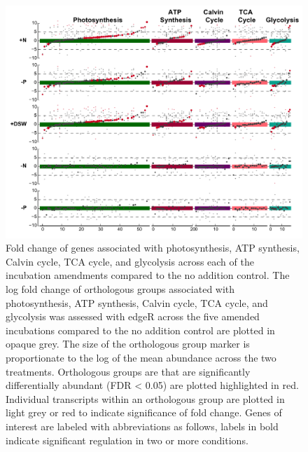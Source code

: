 \begin{figure}[p!]

  \centering
  \includegraphics[width=1\textwidth]{Images/C6_FigureS7_MckewATP.pdf}
    \caption[Fold change of genes associated with photosynthesis, ATP synthesis, Calvin cycle, TCA cycle, and glycolysis across each of the incubation amendments]{Fold change of genes associated with photosynthesis, ATP synthesis, Calvin cycle, TCA cycle, and glycolysis across each of the incubation amendments compared to the no addition control. The log fold change of orthologous groups associated with photosynthesis, ATP synthesis, Calvin cycle, TCA cycle, and glycolysis was assessed with edgeR across the five amended incubations compared to the no addition control are plotted in opaque grey. The size of the orthologous group marker is proportionate to the log of the mean abundance across the two treatments. Orthologous groups are that are significantly differentially abundant (FDR < 0.05) are plotted highlighted in red. Individual transcripts within an orthologous group are plotted in light grey or red to indicate significance of fold change. Genes of interest are labeled with abbreviations as follows, labels in bold indicate significant regulation in two or more conditions. }
    \label{fig:a5f7}
\end{figure}




